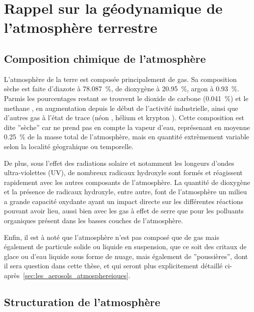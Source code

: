 
\section{Rappel sur la géodynamique de l'atmosphère terrestre}%
\label{sec:structure_atmosphere}

\subsection{Composition chimique de l'atmosphère}%
\label{ssub:composition_chimique_de_latmosphere}

L'atmosphère de la terre est composée principalement de gas. Sa composition sèche est
faite d'diazote  à \SI{78.087}{\percent}, de dioxygène  à
\SI{20.95}{\percent}, argon  à \SI{0.93}{\percent}. Parmis les pourcentages restant
se trouvent le dioxide de carbone  (\SI{0.041}{\percent}) et le methane ,
en augmentation depuis le début de l'activité industrielle, ainsi que d'autres gas à
l'état de trace (néon , hélium  et krypton ).  Cette composition est
dite ''sèche'' car ne prend pas en compte la vapeur d'eau, représenant en moyenne 
\SI{0.25}{\percent} de la masse total de l'atmosphère, mais en quantité extrèmement
variable selon la localité géograhique ou temporelle.

De plus, sous l'effet des radiations solaire et notamment les longeurs d'ondes
ultra-violettes (UV), de nombreux radicaux hydroxyle  sont formés et réagissent
rapidement avec les autres composants de l'atmosphère.  La quantité de dioxygène et la
présence de radicaux hydroxyle, entre autre, font de l'atmosphère un milieu a grande
capacité oxydante ayant un impact directe sur les différentes réactions pouvant avoir lieu,
aussi bien avec les gas à effet de serre que pour les polluants organiques présent dans
les basses couches de l'atmosphère.

Enfin, il est à noté que l'atmosphère n'est pas composé que de gas mais également de
particule solide ou liquide en suspension, que ce soit des critaux de glace ou d'eau
liquide sous forme de nuage, mais également de ''poussières'', dont il sera question dans
cette thèse, et qui seront plus explicitement détaillé
ci-après~\ref{sec:les_aerosols_atmosphereiques}.

\subsection{Structuration de l'atmosphère}%
\label{sub:structuration_de_l_atmosphere}

